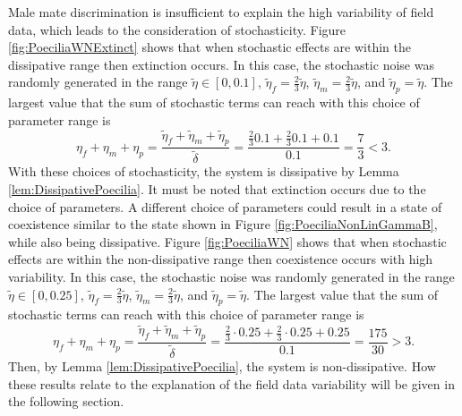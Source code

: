 	Male mate discrimination is insufficient to explain the high variability of field data, which leads to the consideration of stochasticity. Figure \ref{fig:PoeciliaWNExtinct} shows that when stochastic effects are within the dissipative range then extinction occurs. In this case, the stochastic noise was randomly generated in the range $\tilde{\eta} \in [0,0.1]$, $\tilde{\eta}_f = \frac{2}{3}\tilde{\eta}$, $\tilde{\eta}_m = \frac{2}{3} \tilde{\eta}$, and $\tilde{\eta}_p = \tilde{\eta}$. The largest value that the sum of stochastic terms can reach with this choice of parameter range is 
	\[
		\eta_f + \eta_m + \eta_p 	= \frac{\tilde{\eta}_f + \tilde{\eta}_m + \tilde{\eta}_p}{\tilde{\delta}} 
															= \frac{\frac{2}{3} 0.1 + \frac{2}{3} 0.1 + 0.1}{0.1}	 
															= \frac{7}{3} < 3.
	\]
	With these choices of stochasticity, the system is dissipative by Lemma \ref{lem:DissipativePoecilia}. It must be noted that extinction occurs due to the choice of parameters. A different choice of parameters could result in a state of coexistence similar to the state shown in Figure \ref{fig:PoeciliaNonLinGammaB}, while also being dissipative. Figure \ref{fig:PoeciliaWN} shows that when stochastic effects are within the non-dissipative range then coexistence occurs with high variability.  In this case, the stochastic noise was randomly generated  in the range $\tilde{\eta} \in [0,0.25]$, $\tilde{\eta}_f = \frac{2}{3}\tilde{\eta}$, $\tilde{\eta}_m = \frac{2}{3} \tilde{\eta}$, and $\tilde{\eta}_p = \tilde{\eta}$. The largest value that the sum of stochastic terms can reach with this choice of parameter range is
	\[
		\eta_f + \eta_m + \eta_p 	= \frac{\tilde{\eta}_f + \tilde{\eta}_m + \tilde{\eta}_p}{\tilde{\delta}} 
															= \frac{\frac{2}{3} \cdot 0.25 + \frac{2}{3} \cdot 0.25 + 0.25}{0.1}	 
															= \frac{175}{30} > 3.
	\]
	Then, by Lemma \ref{lem:DissipativePoecilia}, the system is non-dissipative.  How these results relate to the explanation of the field data variability will be given in the following section.
